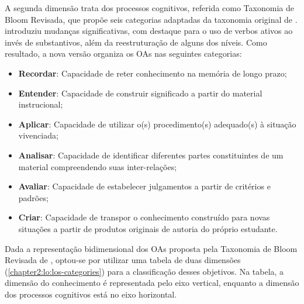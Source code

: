A segunda dimensão trata dos processos cognitivos, referida como Taxonomia de Bloom Revisada, que propõe seis categorias adaptadas da taxonomia original de .  introduziu mudanças significativas, com destaque para o uso de verbos ativos ao invés de substantivos, além da reestruturação de alguns dos níveis. Como resultado, a nova versão organiza os OAs nas seguintes categorias:

\begin{itemize}
    \item \textbf{Recordar}: Capacidade de reter conhecimento na memória de longo prazo;
    \item \textbf{Entender}: Capacidade de construir significado a partir do material instrucional;
    \item \textbf{Aplicar}: Capacidade de utilizar o(s) procedimento(s) adequado(s) à situação vivenciada;
    \item \textbf{Analisar}: Capacidade de identificar diferentes partes constituintes de um material compreendendo suas inter-relações;
    \item \textbf{Avaliar}: Capacidade de estabelecer julgamentos a partir de critérios e padrões;
    \item \textbf{Criar}: Capacidade de transpor o conhecimento construído para novas situações a partir de produtos originais de autoria do próprio estudante.
\end{itemize}

Dada a representação bidimensional dos OAs proposta pela Taxonomia de Bloom Revisada de , optou-se por utilizar uma tabela de duas dimensões (\autoref{chapter2:lo:los-categories}) para a classificação desses objetivos. Na tabela, a dimensão do conhecimento é representada pelo eixo vertical, enquanto a dimensão dos processos cognitivos está no eixo horizontal. 

\begin{quadro}[htbp]
\centering
{}
\end{quadro}


